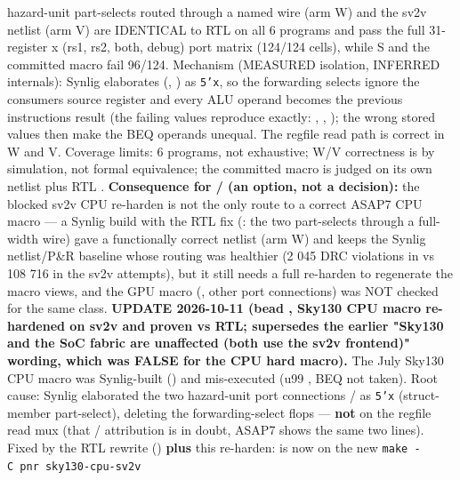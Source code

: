 \begin{record}
{hazard-unit part-selects routed through a named wire (arm W) and the
sv2v netlist (arm V) are IDENTICAL to RTL on all 6 programs and pass the
full 31-register x (rs1, rs2, both, debug) port matrix (124/124 cells)},
while S and the committed macro fail 96/124. Mechanism (MEASURED
isolation, INFERRED internals): Synlig elaborates
(,
) as \texttt{5'x}, so the forwarding selects ignore the
consumer\textquotesingle s source register and every ALU operand becomes
the previous instruction\textquotesingle s result (the failing values
reproduce exactly: , ,
); the wrong stored values then make the BEQ
operands unequal. The regfile read path is correct in W and V. Coverage
limits: 6 programs, not exhaustive; W/V correctness is by simulation,
not formal equivalence; the committed macro is judged on its own netlist
plus RTL . \textbf{Consequence for /
(an option, not a decision):} the blocked sv2v CPU re-harden is not the
only route to a correct ASAP7 CPU macro --- a Synlig build with the RTL
fix (: the two part-selects through a full-width wire) gave a
functionally correct netlist (arm W) and keeps the Synlig
netlist/\allowbreak{}P\&R baseline whose routing was healthier (2 045
DRC violations in  vs 108 716 in the sv2v attempts), but it
still needs a full re-harden to regenerate the macro views, and the GPU
macro (, other 
port connections) was NOT checked for the same class. \bad{}
\textbf{UPDATE 2026-10-11 (bead , Sky130 CPU macro
re-hardened on sv2v and proven vs RTL; supersedes the earlier "Sky130
and the SoC fabric are unaffected (both use the sv2v frontend)" wording,
which was FALSE for the CPU hard macro).} The July Sky130 CPU macro was
Synlig-built () and mis-executed (u99
, BEQ not taken). Root cause: Synlig elaborated the two
hazard-unit port connections
/ as
\texttt{5'x} (struct-member part-select), deleting the 
forwarding-select flops --- \textbf{not}  on the
regfile read mux (that / attribution is in doubt,
ASAP7 shows the same two lines). Fixed by the RTL rewrite ()
\textbf{plus} this re-harden:  is now
 on the new
\texttt{make\ -\allowbreak{}C\ pnr\ sky130-\allowbreak{}cpu-\allowbreak{}sv2v}

\end{record}
